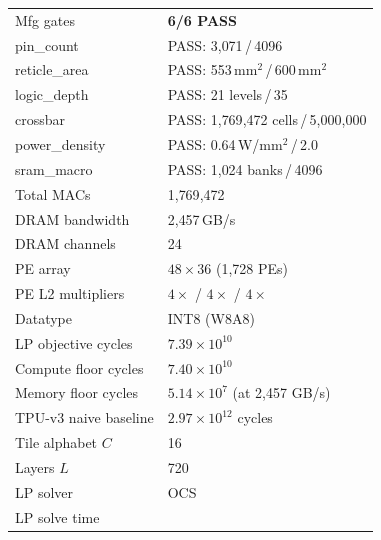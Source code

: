 \begin{table}[h]
\begin{tabular}{@{}ll@{}}
\midrule
Mfg gates               & \textcolor{green!60!black}{\textbf{6/6 PASS}} \\
\quad pin\_count         & PASS: 3{,}071\,/\,4096 \\
\quad reticle\_area      & PASS: 553\,mm$^2$\,/\,600\,mm$^2$ \\
\quad logic\_depth       & PASS: 21 levels\,/\,35 \\
\quad crossbar           & PASS: 1{,}769{,}472 cells\,/\,5{,}000{,}000 \\
\quad power\_density     & PASS: 0.64\,W/mm$^2$\,/\,2.0 \\
\quad sram\_macro        & PASS: 1{,}024 banks\,/\,4096 \\
\midrule
Total MACs              & 1{,}769{,}472 \\
DRAM bandwidth          & 2{,}457\,GB/s \\
DRAM channels           & 24 \\
PE array                & $48 \times 36$ (1{,}728 PEs) \\
PE L2 multipliers       & $4\times$ / $4\times$ / $4\times$ \\
Datatype                & INT8 (W8A8) \\
LP objective cycles     & $7.39 \times 10^{10}$ \\
Compute floor cycles    & $7.40 \times 10^{10}$ \\
Memory floor cycles     & $5.14 \times 10^{7}$ (at 2{,}457 GB/s) \\
TPU-v3 naive baseline   & $2.97 \times 10^{12}$ cycles \\
Tile alphabet $C$       & 16 \\
Layers $L$              & 720 \\
LP solver               & OCS \\
LP solve time           &  \\
\bottomrule
\end{tabular}
\end{table}


